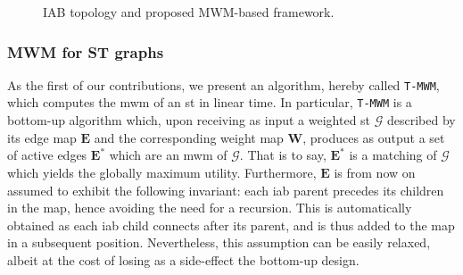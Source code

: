\begin{figure}[t!]
    \centering
    \hfill
    \centering
    \caption{IAB topology and proposed MWM-based framework.}
    \label{fig:fr-top}
\end{figure}

\subsubsection{MWM for ST graphs}
\label{Sec:T-MWM}

As the first of our contributions, we present an algorithm, hereby called \texttt{T-MWM}, which computes the \gls{mwm} of an \gls{st} in linear time. In particular, \texttt{T-MWM} is a bottom-up algorithm which, upon receiving as input a weighted \gls{st} $\mathcal{G}$ described by its edge map $\mathbf{E}$ and the corresponding weight map $\mathbf{W}$, produces as output a set of active edges $\mathbf{E^*}$ which are an \gls{mwm} of $\mathcal{G}$. That is to say, $\mathbf{E^*}$ is a matching of $\mathcal{G}$ which yields the globally maximum utility.
Furthermore, $\mathbf{E}$ is from now on assumed to exhibit the following invariant: each \gls{iab} parent precedes its children in the map, hence avoiding the need for a recursion. 
This is automatically obtained as each \gls{iab} child connects after its parent, and is thus added to the map in a subsequent position.
Nevertheless, this assumption can be easily relaxed, albeit at the cost of losing as a side-effect the bottom-up design.


